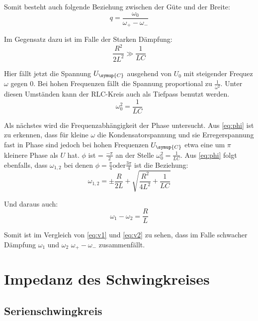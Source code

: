     \noindent Somit besteht auch folgende Beziehung zwischen der Güte und der Breite:
    \begin{equation}
        q = \frac{\omega_0}{\omega_+ - \omega_-} \nonumber
    \end{equation}

    \noindent Im Gegensatz dazu ist im Falle der Starken Dämpfung:
    \begin{equation}
        \frac{R^2}{2L^2} \gg \frac{1}{LC} \nonumber
    \end{equation}

    \noindent Hier fällt jetzt die Spannung $U_{\symup{C}}$ ausgehend von $U_0$ mit steigender Frequez $\omega$ gegen 0. Bei hohen Frequenzen fällt
    die Spannung proportional zu $\frac{1}{\omega^2}$. Unter diesen Umständen kann der RLC-Kreis auch als Tiefpass benutzt werden.
    \begin{equation}
        \omega^2_0 = \frac{1}{LC} \nonumber
    \end{equation}

    \noindent Als nächstes wird die Frequenzabhängigkeit der Phase untersucht. Aus \ref{eq:phi} ist zu erkennen, dass für kleine $\omega$ die 
    Kondensatorspannung und sie Erregerspannung fast in Phase sind jedoch bei hohen Frequenzen $U_{\symup{C}}$ etwa eine um $\pi$ 
    kleinere Phase als $U$ hat. $\phi$ ist = $\frac{-\pi}{2}$ an der Stelle $\omega^2_0 = \frac{1}{LC}$.
    Aus \ref{eq:phi} folgt ebenfalls, dass $\omega_{1,2}$ bei denen $\phi= \frac{\pi}{4} \text{oder} \frac{3\pi}{4}$ ist die Beziehung:
    \begin{equation}
        \omega_{1,2} = \pm  \frac{R}{2L} + \sqrt{\frac{R^2}{4L^2}+ \frac{1}{LC}} \nonumber
    \end{equation}

    \noindent Und daraus auch:
    \begin{equation}
        \omega_1 - \omega_2 = \frac{R}{L} 
        \label{eq:v2}
    \end{equation}

    \noindent Somit ist im Vergleich von \ref{eq:v1} und \ref{eq:v2} zu sehen, dass im Falle schwacher Dämpfung $\omega_1$ und $\omega_2$ 
    $\omega_+ - \omega_-$ zusammenfällt.


    \section{Impedanz des Schwingkreises}


        \subsection{Serienschwingkreis}

